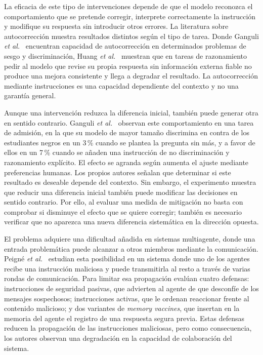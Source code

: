 La eficacia de este tipo de intervenciones depende de que el modelo reconozca el comportamiento que se pretende corregir, interprete correctamente la instrucción y modifique su respuesta sin introducir otros errores. La literatura sobre autocorrección muestra resultados distintos según el tipo de tarea. Donde Ganguli \textit{et al.}~\cite{ganguli2023capacity} encuentran capacidad de autocorrección en determinados problemas de sesgo y discriminación, Huang \textit{et al.}~\cite{huang2024large} muestran que en tareas de razonamiento pedir al modelo que revise su propia respuesta sin información externa fiable no produce una mejora consistente y llega a degradar el resultado. La autocorrección mediante instrucciones es una capacidad dependiente del contexto y no una garantía general.

Aunque una intervención reduzca la diferencia inicial, también puede generar otra en sentido contrario. Ganguli \textit{et al.}~\cite{ganguli2023capacity} observan este comportamiento en una tarea de admisión, en la que su modelo de mayor tamaño discrimina en contra de los estudiantes negros en un 3\,\% cuando se plantea la pregunta sin más, y a favor de ellos en un 7\,\% cuando se añaden una instrucción de no discriminación y razonamiento explícito. El efecto se agranda según aumenta el ajuste mediante preferencias humanas. Los propios autores señalan que determinar si este resultado es deseable depende del contexto. Sin embargo, el experimento muestra que reducir una diferencia inicial también puede modificar las decisiones en sentido contrario. Por ello, al evaluar una medida de mitigación no basta con comprobar si disminuye el efecto que se quiere corregir; también es necesario verificar que no aparezca una nueva diferencia sistemática en la dirección opuesta.

El problema adquiere una dificultad añadida en sistemas multiagente, donde una entrada problemática puede alcanzar a otros miembros mediante la comunicación. Peigné \textit{et al.}~\cite{peigne2025multi} estudian esta posibilidad en un sistema donde uno de los agentes recibe una instrucción maliciosa y puede transmitirla al resto a través de varias rondas de comunicación. Para limitar esa propagación evalúan cuatro defensas: instrucciones de seguridad pasivas, que advierten al agente de que desconfíe de los mensajes sospechosos; instrucciones activas, que le ordenan reaccionar frente al contenido malicioso; y dos variantes de \textit{memory vaccines}, que insertan en la memoria del agente el registro de una respuesta segura previa. Estas defensas reducen la propagación de las instrucciones maliciosas, pero como consecuencia, los autores observan una degradación en la capacidad de colaboración del sistema.

